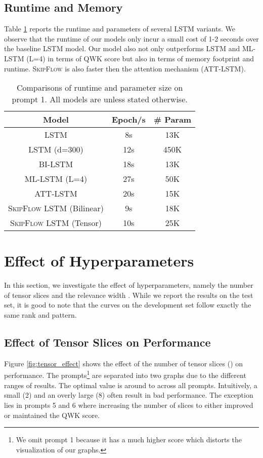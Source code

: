 \documentclass[letterpaper]{article}
\begin{document}
\subsection{Runtime and Memory}
Table \ref{tab:runtime} reports the runtime and parameters of several LSTM variants. We observe that the runtime of our models only incur a small cost of 1-2 seconds over the baseline LSTM model. Our model also not only outperforms LSTM and ML-LSTM (L=4) in terms of QWK score but also in terms of memory footprint and runtime. \textsc{SkipFlow} is also faster then the attention mechanism (ATT-LSTM).
\begin{table}[htbp]
  \centering
\small
    \begin{tabular}{|c|c|c|}
    \hline
    Model & Epoch/s & \# Param \\
    \hline
    LSTM  &  8s     &  13K\\
        LSTM (d=300)  & 12s     & 450K \\
        BI-LSTM  & 18s & 13K \\
        ML-LSTM (L=4)  & 27s & 50K \\
        ATT-LSTM & 20s & 15K  \\
         \textsc{SkipFlow} LSTM (Bilinear) & 9s       &  18K\\
        \textsc{SkipFlow} LSTM (Tensor)  & 10s      & 25K \\
        \hline
    \end{tabular}\caption{Comparisons of runtime and parameter size on prompt 1. All models are  unless stated otherwise.}
  \label{tab:runtime}\end{table}


\section{Effect of Hyperparameters}
In this section, we investigate the effect of hyperparameters, namely the number of tensor slices  and the relevance width . While we report the results on the test set, it is good to note that the curves on the development set follow exactly the same rank and pattern. 

\subsection{Effect of Tensor Slices on Performance}

Figure \ref{fig:tensor_effect} shows the effect of the number of tensor slices () on performance. The prompts\footnote{We omit prompt 1 because it has a much higher score which distorts the visualization of our graphs.} are separated into two graphs due to the different ranges of results. The optimal  value is around  to  across all prompts. Intuitively, a small  (2) and an overly large  (8) often result in bad performance. The exception lies in prompts 5 and 6 where increasing the number of slices to  either improved or maintained the QWK score. 
\end{document}
